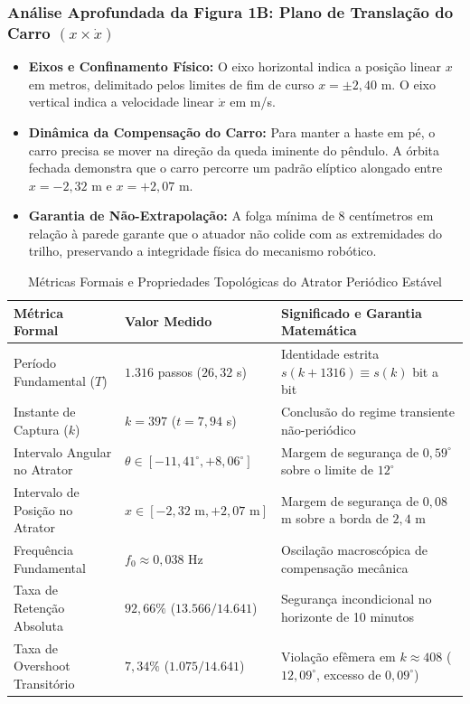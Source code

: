 \documentclass[11pt,a4paper]{article}
\theoremstyle{definition}
\begin{document}
\subsubsection{Análise Aprofundada da Figura 1B: Plano de Translação do Carro $(x \times \dot{x})$}
\begin{itemize}
    \item \textbf{Eixos e Confinamento Físico:} O eixo horizontal indica a posição linear $x$ em metros, delimitado pelos limites de fim de curso $x = \pm 2{,}40$ m. O eixo vertical indica a velocidade linear $\dot{x}$ em m/s.
    \item \textbf{Dinâmica da Compensação do Carro:} Para manter a haste em pé, o carro precisa se mover na direção da queda iminente do pêndulo. A órbita fechada demonstra que o carro percorre um padrão elíptico alongado entre $x = -2{,}32$ m e $x = +2{,}07$ m. 
    \item \textbf{Garantia de Não-Extrapolação:} A folga mínima de $8$ centímetros em relação à parede garante que o atuador não colide com as extremidades do trilho, preservando a integridade física do mecanismo robótico.
\end{itemize}

\begin{table}[!ht]
\centering
\small
\caption{Métricas Formais e Propriedades Topológicas do Atrator Periódico Estável}
\label{tab:metricas_atrator}
\vspace{0.15cm}
\begin{tabularx}{\textwidth}{l l X}
\toprule
\textbf{Métrica Formal} & \textbf{Valor Medido} & \textbf{Significado e Garantia Matemática} \\
\midrule
Período Fundamental ($T$) & $1.316$ passos ($26{,}32$ s) & Identidade estrita $s(k + 1316) \equiv s(k)$ bit a bit \\
Instante de Captura ($k$) & $k = 397$ ($t = 7{,}94$ s) & Conclusão do regime transiente não-periódico \\
Intervalo Angular no Atrator & $\theta \in [-11{,}41^\circ, +8{,}06^\circ]$ & Margem de segurança de $0{,}59^\circ$ sobre o limite de $12^\circ$ \\
Intervalo de Posição no Atrator & $x \in [-2{,}32\text{ m}, +2{,}07\text{ m}]$ & Margem de segurança de $0{,}08$ m sobre a borda de $2{,}4$ m \\
Frequência Fundamental & $f_0 \approx 0{,}038$ Hz & Oscilação macroscópica de compensação mecânica \\
Taxa de Retenção Absoluta & $92{,}66\%$ ($13.566 / 14.641$) & Segurança incondicional no horizonte de 10 minutos \\
Taxa de Overshoot Transitório & $7{,}34\%$ ($1.075 / 14.641$) & Violação efêmera em $k \approx 408$ ($12{,}09^\circ$, excesso de $0{,}09^\circ$) \\
\bottomrule
\end{tabularx}
\end{table}
\end{document}
